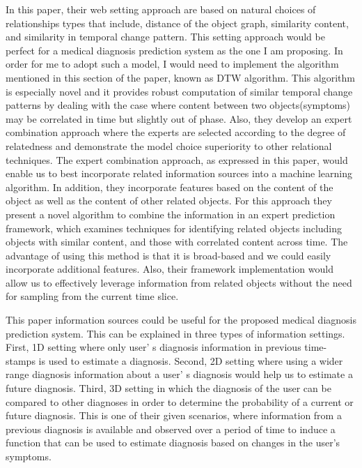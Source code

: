 \documentclass{sig-alternate}
\begin{document}
In this paper, their web setting approach are based on natural choices of relationships types that include, distance of the object graph, similarity content, and similarity in temporal change pattern. This setting approach would be perfect for a medical diagnosis prediction system as the one I am proposing. In order for me to adopt such a model, I would need to implement the algorithm mentioned in this section of the paper, known as DTW algorithm. This algorithm is especially novel and it provides robust computation of similar temporal change patterns by dealing with the case where content between two objects(symptoms) may be correlated in time but slightly out of phase. Also, they develop an expert combination approach where the experts are selected according to the degree of relatedness and demonstrate the model choice superiority to other relational techniques. The expert combination approach, as expressed in this paper, would enable us to best incorporate related information sources into a machine learning algorithm. In addition, they incorporate features based on the content of the object as well as the content of other related objects. For this approach they present a novel algorithm to combine the information in an expert prediction framework, which examines techniques for identifying related objects including objects with similar content, and those with correlated content across time. The advantage of using this method is that it is broad-based and we could easily incorporate additional features. Also, their framework implementation would allow us to effectively  leverage information from related objects without the need for sampling from the current time slice.\newline
	
This paper information sources could be useful for the proposed medical diagnosis prediction system. This can be explained in three types of information settings. First, 1D setting where only user' s diagnosis information in previous time-stamps is used to estimate a diagnosis. Second, 2D setting where using a wider range diagnosis information about a user' s diagnosis would help us to estimate a future diagnosis. Third, 3D setting in which the diagnosis of the user can be compared to other diagnoses in order to determine the probability of a current or future diagnosis. This is one of their given scenarios, where information from a previous diagnosis is available and observed over a period of time to induce a function that can be used to estimate diagnosis based on changes in the user's symptoms.\newline
	
\end{document}
